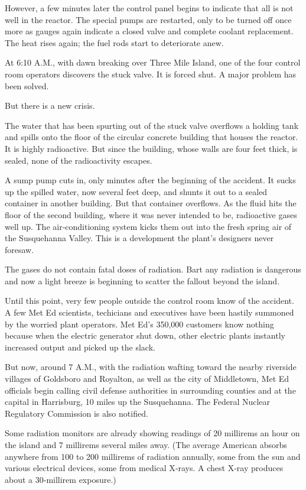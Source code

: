 However, a few minutes later the control panel begins to indicate that
all is not well in the reactor. The special pumps are restarted, only to
be turned off once more as gauges again indicate a closed valve and
complete coolant replacement. The heat rises again; the fuel rods start
to deteriorate anew.

At 6:10 A.M., with dawn breaking over Three Mile Island, one of the four
control room operators discovers the stuck valve. It is forced shut. A
major problem has been solved.

But there is a new crisis.

The water that has been spurting out of the stuck valve overflows a
holding tank and spills onto the floor of the circular concrete building
that houses the reactor. It is highly radioactive. But since the
building, whose walls are four feet thick, is sealed, none of the
radioactivity escapes.

A sump pump cuts in, only minutes after the beginning of the accident.
It sucks up the spilled water, now several feet deep, and shunts it out
to a sealed container in another building. But that container overflows.
As the fluid hits the floor of the second building, where it was never
intended to be, radioactive gases well up. The air‐conditioning system
kicks them out into the fresh spring air of the Susquehanna Valley. This
is a development the plant's designers never foresaw.

The gases do not contain fatal doses of radiation. Bart any radiation is
dangerous and now a light breeze is beginning to scatter the fallout
beyond the island.

Until this point, very few people outside the control room know of the
accident. A few Met Ed scientists, techicians and executives have been
hastily summoned by the worried plant operators. Met Ed's 350,000
customers know nothing because when the electric generator shut down,
other electric plants instantly increased output and picked up the
slack.

But now, around 7 A.M., with the radiation wafting toward the nearby
riverside villages of Goldsboro and Royalton, as well as the city of
Middletown, Met Ed officials begin calling civil defense authorities in
surrounding counties and at the capital in Harrisburg, 10 miles up the
Susquehanna. The Federal Nuclear Regulatory Commission is also notified.

Some radiation monitors are already showing readings of 20 millirems an
hour on the island and 7 millirems several miles away. (The average
American absorbs anywhere from 100 to 200 millirems of radiation
annually, some from the sun and various electrical devices, some from
medical X‐rays. A chest X‐ray produces about a 30‐millirem exposure.)

